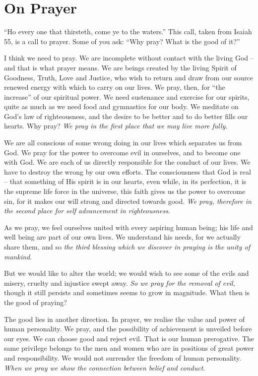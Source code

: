 \chapter{On Prayer}

``Ho every one that thirsteth, come ye to the waters.''
This call, taken from Isaiah 55, is a call to prayer. Some
of you ask: ``Why pray? What is the good of it?''

I think we need to pray. We are incomplete without
contact with the living God -- and that is what prayer
means. We are beings created by the living Spirit of
Goodness, Truth, Love and Justice, who wish to return and
draw from our source renewed energy with which to carry on
our lives. We pray, then, for “the increase'' of our
spiritual power. We need sustenance and exercise for our
spirits, quite as much as we need food and gymnastics for
our body. We meditate on God's law of righteousness, and
the desire to be better and to do better fills our hearts.
Why pray? \textsl{We pray in the first place that we may live more
fully}.

We are all conscious of some wrong doing in our lives
which separates us from God. We pray for the power to
overcome evil in ourselves, and to become one with God. We
are each of us directly responsible for the conduct of our
lives. We have to destroy the wrong by our own efforts.
The consciousness that God is real -- that something of His
spirit is in our hearts, even while, in its perfection, it
is the supreme life force in the universe, this faith gives
us the power to overcome sin, for it makes our will strong
and directed towards good. \textsl{We pray, therefore in the
second place for self advancement in righteousness}.

As we pray, we feel ourselves united with every
aspiring human being; his life and well being are part of
our own lives. We understand his needs, for we actually
share them, and so \textsl{the third blessing which we discover in
  praying is the unity of mankind}.

But we would like to alter the world; we would wish to
see some of the evils and misery, cruelty and injustice
swept away. \textsl{So we pray for the removal of evil}, though it
still persists and sometimes seems to grow in magnitude.
What then is the good of praying?

The good lies in another direction. In prayer, we
realise the value and power of human personality. We pray,
and the possibility of achievement is unveiled before our
eyes. We can choose good and reject evil. That is our
human prerogative. The same privilege belongs to the men
and women who are in positions of great power and responsibility.
We would not surrender the freedom of human
personality. \textsl{When we pray we show the connection between
belief and conduct}.

